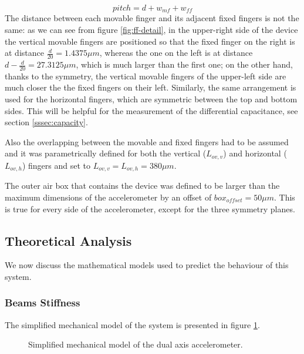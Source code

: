 \documentclass[lettersize,journal]{IEEEtran}
\begin{document}
        \begin{equation}
            pitch = d+w_{mf}+w_{ff}
        \end{equation}
        The distance between each movable finger and its adjacent fixed fingers is not the same: as we can see from  figure \ref{fig:ff-detail}, in the upper-right side of the device the vertical movable fingers are positioned so that the fixed finger on the right is at distance \(\frac{d}{20}=1.4375\mu m\), whereas the one on the left is at distance \(d-\frac{d}{20}=27.3125\mu m\), which is much larger than the first one; on the other hand, thanks to the symmetry, the vertical movable fingers of the upper-left side are much closer the the fixed fingers on their left. Similarly, the same arrangement is used for the horizontal fingers, which are symmetric between the top and bottom sides. This will be helpful for the measurement of the differential capacitance, see section \ref{sssec:capacity}.
        
        Also the overlapping between the movable and fixed fingers had to be assumed and it was parametrically defined for both the vertical (\(L_{ov,v}\)) and horizontal (\(L_{ov,h}\)) fingers and set to \(L_{ov,v}=L_{ov,h}=380\mu m\).
        
        The outer air box that contains the device was defined to be larger than the maximum dimensions of the accelerometer by an offset of \(box_{offset}=50\mu m\). This is true for every side of the accelerometer, except for the three symmetry planes.
        
        \subsection{Theoretical Analysis}
        We now discuss the mathematical models used to predict the behaviour of this system.
        
        \subsubsection{Beams Stiffness}\label{sssec:stiffness}
        The simplified mechanical model of the system is presented in figure \ref{fig:model}.
        
        \begin{figure}[!h]
            \centering
            
            \caption{Simplified mechanical model of the dual axis accelerometer.}
            \label{fig:model}
        \end{figure}
        
\end{document}
